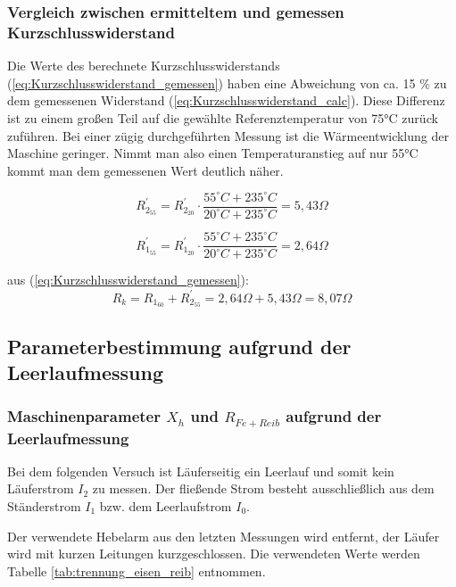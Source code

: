\documentclass[conference]{IEEEtran}
\begin{document}
\subsubsection{Vergleich zwischen ermitteltem und gemessen Kurzschlusswiderstand}

Die Werte des berechnete Kurzschlusswiderstands
(\ref{eq:Kurzschlusswiderstand_gemessen}) haben eine Abweichung von ca. 15 \%
zu dem gemessenen Widerstand (\ref{eq:Kurzschlusswiderstand_calc}). Diese
Differenz ist zu einem großen Teil auf die gewählte Referenztemperatur von 75°C
zurück zuführen. Bei einer zügig durchgeführten Messung ist die
Wärmeentwicklung der Maschine geringer. Nimmt man also einen Temperaturanstieg
auf nur 55°C kommt man dem gemessenen Wert deutlich näher.

\begin{equation}
    R_{2_{55}}^\prime = R_{2_{20}}^\prime \cdot \dfrac{55^\circ \si{C} + 235^\circ \si{C}}{20^\circ \si{C} + 235^\circ \si{C}} = 5,43 \Omega
\end{equation}

\begin{equation}
    R_{1_{55}}^\prime = R_{1_{20}}^\prime \cdot \dfrac{55^\circ \si{C} + 235^\circ \si{C}}{20^\circ \si{C} + 235^\circ \si{C}} = 2,64 \Omega
\end{equation}

aus (\ref{eq:Kurzschlusswiderstand_gemessen}):
\begin{equation}
    \boxed{R_{k} = R_{1_{60}} + R_{2_{55}}^\prime = 2,64 \Omega + 5,43 \Omega = 8,07 \Omega}
\end{equation}


\subsection{Parameterbestimmung aufgrund der Leerlaufmessung}
\subsubsection{Maschinenparameter $X_h$ und $R_{Fe+Reib}$ aufgrund der Leerlaufmessung}

Bei dem folgenden Versuch ist Läuferseitig ein Leerlauf und somit kein
Läuferstrom $I_{2}$ zu messen. Der fließende Strom besteht ausschließlich aus
dem Ständerstrom $I_{1}$ bzw. dem Leerlaufstrom $I_{0}$.

Der verwendete Hebelarm aus den letzten Messungen wird entfernt, der Läufer
wird mit kurzen Leitungen kurzgeschlossen.  Die verwendeten Werte werden
Tabelle \ref{tab:trennung_eisen_reib} entnommen.
\end{document}
